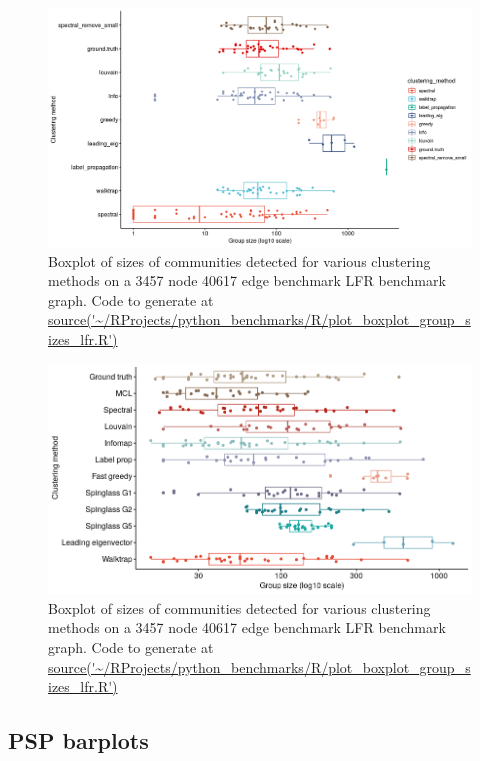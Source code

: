   \begin{figure}
      \centering
      \includegraphics[width=\textwidth]{images/Rplot_draft_plot_boxplot_group_sizes_lfr.png}
      \caption{Boxplot of sizes of communities detected for various clustering methods on a 3457 node 40617 edge benchmark LFR benchmark graph. Code to generate at \url{source('~/RProjects/python_benchmarks/R/plot_boxplot_group_sizes_lfr.R')}}
      \label{fig:boxplot group size lfr clustering methods}
  \end{figure}
 
 
  \begin{figure}
      \centering
          \includegraphics[width=\textwidth]{images/chapter_community_detection/ggplot2/LFR/Rplot_groupsize_filter.png}
      \caption{Boxplot of sizes of communities detected for various clustering methods on a 3457 node 40617 edge benchmark LFR benchmark graph. Code to generate at \url{source('~/RProjects/python_benchmarks/R/plot_boxplot_group_sizes_lfr.R')}}
      \label{fig:boxplot group size lfr clustering methods}
  \end{figure}
  
  
  \subsection{PSP barplots}
  
